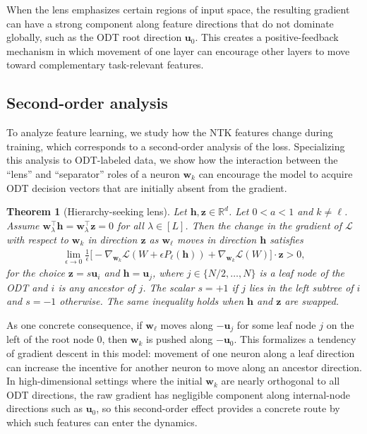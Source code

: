 \documentclass{article}
\theoremstyle{plain}
\newtheorem{theorem}{Theorem}[section]
\theoremstyle{definition}
\theoremstyle{remark}
\newcommand{\R}{{\mathbb R}}
\newcommand{\1}{{\mathbf 1}}
\newcommand{\0}{{\mathbf 0}}
\newcommand{\h}{{\mathbf h}}
\newcommand{\z}{{\mathbf z}}
\newcommand{\w}{{\mathbf w}}
\newcommand{\bu}{{\mathbf u}}
\renewcommand{\>}{{\rightarrow}}
\begin{document}
When the lens emphasizes certain regions of input space, the resulting gradient can have a strong component along feature directions that do not dominate globally, such as the ODT root direction $\bu_0$. This creates a positive-feedback mechanism in which movement of one layer can encourage other layers to move toward complementary task-relevant features.

\subsection{Second-order analysis}
\label{sec:second_order_analysis}

To analyze feature learning, we study how the NTK features change during training, which corresponds to a second-order analysis of the loss. Specializing this analysis to ODT-labeled data, we show how the interaction between the “lens” and “separator” roles of a neuron $\w_k$ can encourage the model to acquire ODT decision vectors that are initially absent from the gradient.

\begin{theorem}[Hierarchy-seeking lens]
\label{thm:second_order_lens}
Let $\h,\z \in \R^d$. Let $0<a<1$ and $k\neq \ell$. Assume $\w_\lambda^\top \h = \w_\lambda^\top \z = 0$ for all $\lambda \in [L]$. Then the change in the gradient of $\mathcal{L}$ with respect to $\w_k$ in direction $\z$ as $\w_\ell$ moves in direction $\h$ satisfies
\begin{align*}
\lim_{\epsilon \to 0} \frac{1}{\epsilon} \Big[
 -\nabla_{\w_k} \mathcal{L}(W + \epsilon P_\ell(\h))
 + \nabla_{\w_k} \mathcal{L}(W) \Big]\cdot \z > 0,
\end{align*}
for the choice $\z = s \bu_i$ and $\h = \bu_j$, where $j\in\{N/2,\ldots,N\}$ is a leaf node of the ODT and $i$ is any ancestor of $j$. The scalar $s=+1$ if $j$ lies in the left subtree of $i$ and $s=-1$ otherwise. The same inequality holds when $\h$ and $\z$ are swapped.
\end{theorem}

As one concrete consequence, if $\w_\ell$ moves along $-\bu_j$ for some leaf node $j$ on the left of the root node $0$, then $\w_k$ is pushed along $-\bu_0$. This formalizes a tendency of gradient descent in this model: movement of one neuron along a leaf direction can increase the incentive for another neuron to move along an ancestor direction. In high-dimensional settings where the initial $\w_k$ are nearly orthogonal to all ODT directions, the raw gradient has negligible component along internal-node directions such as $\bu_0$, so this second-order effect provides a concrete route by which such features can enter the dynamics.
\end{document}
